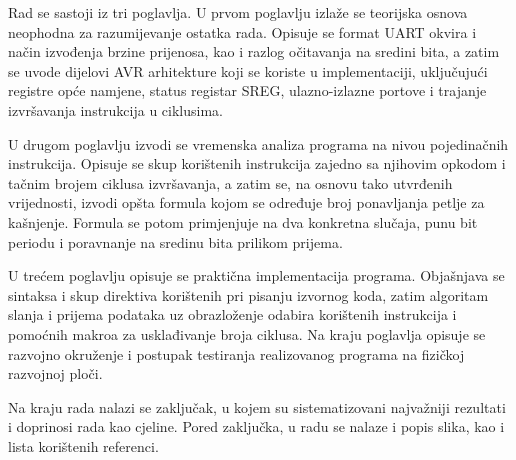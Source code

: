 Rad se sastoji iz tri poglavlja. U prvom poglavlju izlaže se teorijska
osnova neophodna za razumijevanje ostatka rada. Opisuje se format
\foreignlanguage{english}{UART} okvira i način izvođenja brzine
prijenosa, kao i razlog očitavanja na sredini bita, a zatim se uvode
dijelovi \foreignlanguage{english}{AVR} arhitekture koji se koriste u
implementaciji, uključujući registre opće namjene, status registar
\foreignlanguage{english}{SREG}, ulazno-izlazne portove i trajanje
izvršavanja instrukcija u ciklusima.

U drugom poglavlju izvodi se vremenska analiza programa na nivou
pojedinačnih instrukcija. Opisuje se skup korištenih instrukcija zajedno
sa njihovim opkodom i tačnim brojem ciklusa izvršavanja, a zatim se, na
osnovu tako utvrđenih vrijednosti, izvodi opšta formula kojom se
određuje broj ponavljanja petlje za kašnjenje. Formula se potom
primjenjuje na dva konkretna slučaja, punu bit periodu i poravnanje na
sredinu bita prilikom prijema.

U trećem poglavlju opisuje se praktična implementacija programa.
Objašnjava se sintaksa i skup direktiva korištenih pri pisanju izvornog
koda, zatim algoritam slanja i prijema podataka uz obrazloženje odabira
korištenih instrukcija i pomoćnih makroa za usklađivanje broja ciklusa.
Na kraju poglavlja opisuje se razvojno okruženje i postupak testiranja
realizovanog programa na fizičkoj razvojnoj ploči.

Na kraju rada nalazi se zaključak, u kojem su sistematizovani
najvažniji rezultati i doprinosi rada kao cjeline. Pored zaključka, u
radu se nalaze i popis slika, kao i lista korištenih referenci.

\newpage
